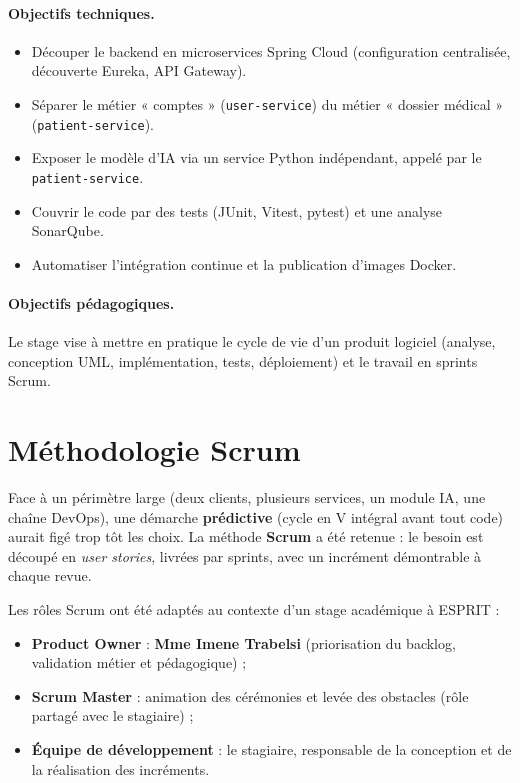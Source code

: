 \documentclass[12pt,a4paper,oneside]{report}
\begin{document}
\paragraph{Objectifs techniques.}
\begin{itemize}[leftmargin=1.4em]
  \item Découper le backend en microservices Spring Cloud (configuration centralisée, découverte Eureka, API Gateway).
  \item Séparer le métier « comptes » (\texttt{user-service}) du métier « dossier médical » (\texttt{patient-service}).
  \item Exposer le modèle d'IA via un service Python indépendant, appelé par le \texttt{patient-service}.
  \item Couvrir le code par des tests (JUnit, Vitest, pytest) et une analyse SonarQube.
  \item Automatiser l'intégration continue et la publication d'images Docker.
\end{itemize}

\paragraph{Objectifs pédagogiques.}
Le stage vise à mettre en pratique le cycle de vie d'un produit logiciel (analyse, conception UML, implémentation, tests, déploiement) et le travail en sprints Scrum.

\section{Méthodologie Scrum}

Face à un périmètre large (deux clients, plusieurs services, un module IA, une chaîne DevOps), une démarche \textbf{prédictive} (cycle en V intégral avant tout code) aurait figé trop tôt les choix. La méthode \textbf{Scrum} a été retenue : le besoin est découpé en \emph{user stories}, livrées par sprints, avec un incrément démontrable à chaque revue.

Les rôles Scrum ont été adaptés au contexte d'un stage académique à ESPRIT :
\begin{itemize}[leftmargin=1.4em]
  \item \textbf{Product Owner} : \textbf{Mme Imene Trabelsi} (priorisation du backlog, validation métier et pédagogique) ;
  \item \textbf{Scrum Master} : animation des cérémonies et levée des obstacles (rôle partagé avec le stagiaire) ;
  \item \textbf{Équipe de développement} : le stagiaire, responsable de la conception et de la réalisation des incréments.
\end{itemize}
\end{document}
